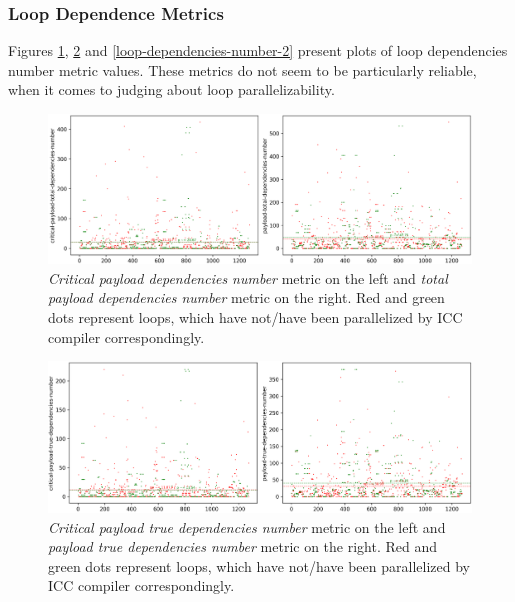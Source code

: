 \subsubsection{Loop Dependence Metrics}
\label{analysis-loop-dependence-metrics}
\qquad Figures \ref{loop-dependencies-number-0}, \ref{loop-dependencies-number-1} and \ref{loop-dependencies-number-2} present plots of loop dependencies number metric values. These metrics do not seem to be particularly reliable, when it comes to judging about loop parallelizability.  
\begin{figure}[h]
\centering
\includegraphics[width=\linewidth]{figs/loop-dependencies-number-0.png}
\caption{\textit{Critical payload dependencies number} metric on the left and \textit{total payload dependencies number} metric on the right. Red and green dots represent loops, which have not/have been parallelized by ICC compiler correspondingly.}
\label{loop-dependencies-number-0}
\end{figure}
\begin{figure}[h]
\centering
\includegraphics[width=\linewidth]{figs/loop-dependencies-number-1.png}
\caption{\textit{Critical payload true dependencies number} metric on the left and \textit{payload true dependencies number} metric on the right. Red and green dots represent loops, which have not/have been parallelized by ICC compiler correspondingly.}
\label{loop-dependencies-number-1}
\end{figure}

